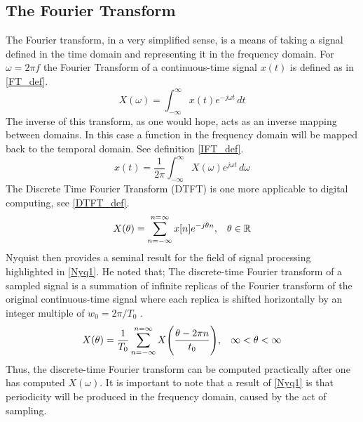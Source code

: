 \subsection{The Fourier Transform}
The Fourier transform, in a very simplified sense, is a means of taking a signal defined in the time domain and representing it in the frequency domain. For $\omega = 2\pi f$ the Fourier Transform of a continuous-time signal $x(t)$ is defined as in \ref{FT_def}.
\begin{equation}\label{FT_def}
    X(\omega) = \int_{-\infty}^{\infty} x(t) e^{-j\omega t} \, dt
\end{equation}
The inverse of this transform, as one would hope, acts as an inverse mapping between domains. In this case a function in the frequency domain will be mapped back to the temporal domain. See definition \ref{IFT_def}.
\begin{equation}\label{IFT_def}
    x(t) = \dfrac{1}{2\pi} \int_{-\infty}^{\infty} X(\omega) e^{j\omega t} \, d\omega
\end{equation}
The Discrete Time Fourier Transform (DTFT) is one more applicable to digital computing, see \ref{DTFT_def}.
\begin{equation}\label{DTFT_def}
    X(\theta) = \sum_{n = -\infty}^{n = \infty} x[n] e^{-j\theta n}, \hspace{3mm} \theta \in \mathbb{R}
\end{equation}
Nyquist then provides a seminal result for the field of signal processing highlighted in \ref{Nyq1}. He noted that; The discrete-time Fourier transform of a sampled signal is a summation of infinite replicas of the Fourier transform of the original continuous-time signal where each replica is shifted horizontally by an integer multiple of $w_0 = 2\pi / T_0$ \cite{SP_03_textbook}.
\begin{equation}\label{Nyq1}
    X(\theta) = \dfrac{1}{T_0}\sum_{n = -\infty}^{n = \infty} X\Bigg( \dfrac{\theta - 2 \pi n}{t_0} \Bigg), \hspace{3mm} \infty < \theta < \infty
\end{equation}
Thus, the discrete-time Fourier transform can be computed practically after one has computed $X(\omega)$. It is important to note that a result of \ref{Nyq1} is that periodicity will be produced in the frequency domain, caused by the act of sampling.

